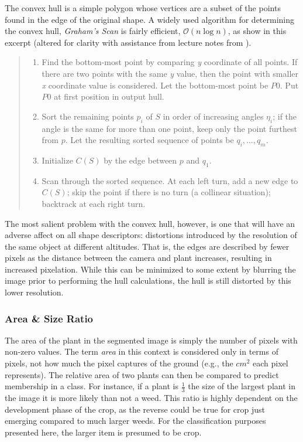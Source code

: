 \documentclass[letterpaper]{report}
\begin{document}
{\begin{figure}[h!]
\end{figure}
The convex hull is a simple polygon whose vertices are a subset of the points found in the edge of the original shape. A widely used algorithm for determining the convex hull, \textit{Graham's Scan} is fairly efficient, $\mathcal{O}(n\log n)$, as \citeauthor{Klette2004-qz} show in this excerpt (altered for clarity with assistance from lecture notes from \citeauthor{Prosser1998-mi}). \parencite{Klette2004-qz}
\begin{quote}
\begin{enumerate}
	\item{Find the bottom-most point by comparing \textit{y} coordinate of all points. If there are two points with the same \textit{y} value, then the point with smaller \textit{x} coordinate value is considered. Let the bottom-most point be $P0$. Put $P0$ at first position in output hull.}
	\item{Sort the remaining points $p_i$ of $S$ in order of increasing angles $\eta_i$; if the angle is the same for more than one point, keep only the point furthest from $p$. Let the resulting sorted sequence of points be $q_i,..., q_m$.}
	\item{Initialize $C(S)$ by the edge between $p$ and $q_1$.}
	\item{Scan through the sorted sequence. At each left turn, add a new edge to $C(S)$; skip the point if there is no turn (a collinear situation); backtrack at each right turn.}
\end{enumerate}
\end{quote}
The most salient problem with the convex hull, however, is one that will have an adverse affect on all shape descriptors: distortions introduced by the resolution of the same object at different altitudes. That is, the edges are described by fewer pixels as the distance between the camera and plant increases, resulting in increased pixelation. While this can be minimized to some extent by blurring the image prior to performing the hull calculations, the hull is still distorted by this lower resolution.

\subsubsection{Area \& Size Ratio}
The area of the plant in the segmented image is simply the number of pixels with non-zero values. The term \textit{area} in this context is considered only in terms of pixels, not how much the pixel captures of the ground (e.g., the $cm^2$ each pixel represents). The relative area of two plants can then be compared to predict membership in a class. For instance, if a plant is $\frac{1}{3}$ the size of the largest plant in the image it is more likely than not a weed. This ratio is highly dependent on the development phase of the crop, as the reverse could be true for crop just emerging compared to much larger weeds. For the classification purposes presented here, the larger item is presumed to be crop.

}
\end{document}
